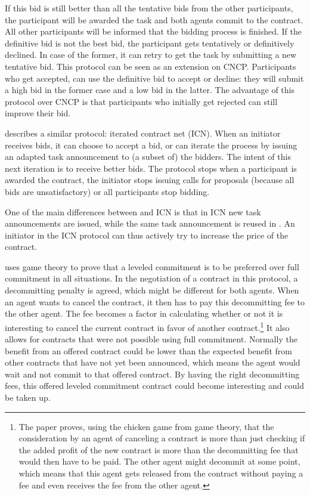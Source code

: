 \documentclass[10pt,a4paper,twocolumn]{article}
\begin{document}
If this bid is still better than all the tentative bids from the other participants, the participant will be awarded the task and both agents commit to the contract. All other participants will be informed that the bidding process is finished. If the definitive bid is not the best bid, the participant gets tentatively or definitively declined. In case of the former, it can retry to get the task by submitting a new tentative bid. This protocol can be seen as an extension on CNCP. Participants who get accepted, can use the definitive bid to accept or decline: they will submit a high bid in the former case and a low bid in the latter. The advantage of this protocol over CNCP is that participants who initially get rejected can still improve their bid.

\cite{CNETIterativeStandard} describes a similar protocol: iterated contract net (ICN). When an initiator receives bids, it can choose to accept a bid, or can iterate the process by issuing an adapted task announcement to (a subset of) the bidders. The intent of this next iteration is to receive better bids. The protocol stops when a participant is awarded the contract, the initiator stops issuing calls for proposals (because all bids are unsatisfactory) or all participants stop bidding.

One of the main differences between \cite{TentativeBidding} and ICN is that in ICN new task announcements are issued, while the same task announcement is reused in \cite{TentativeBidding}. An initiator in the ICN protocol can thus actively try to increase the price of the contract.  

\cite{LeveledCommitment} uses game theory to prove that a leveled commitment is to be preferred over full commitment in all situations. In the negotiation of a contract in this protocol, a decommitting penalty is agreed, which might be different for both agents. When an agent wants to cancel the contract, it then has to pay this decommitting fee to the other agent. The fee becomes a factor in calculating whether or not it is interesting to cancel the current contract in favor of another contract.\footnote{The paper proves, using the chicken game from game theory, that the consideration by an agent of canceling a contract is more than just checking if the added profit of the new contract is more than the decommitting fee that would then have to be paid. The other agent might decommit at some point, which means that this agent gets released from the contract without paying a fee and even receives the fee from the other agent.} It also allows for contracts that were not possible using full commitment. Normally the benefit from an offered contract could be lower than the expected benefit from other contracts that have not yet been announced, which means the agent would wait and not commit to that offered contract. By having the right decommitting fees, this offered leveled commitment contract could become interesting and could be taken up.
\end{document}
